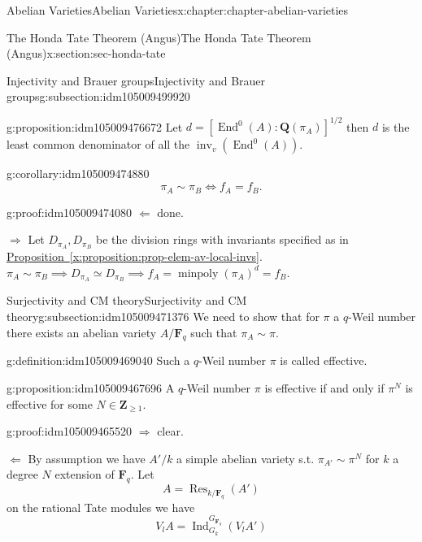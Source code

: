 \documentclass[oneside,10pt,]{book}
\numberwithin{equation}{section}
\newcommand{\lb}{[}
\newcommand{\rb}{]}
\newcommand{\ZZ}{\mathbf{Z}}
\newcommand{\QQ}{\mathbf{Q}}
\newcommand{\FF}{\mathbf{F}}
\DeclareMathOperator{\End}{End}
\DeclareMathOperator{\Ind}{Ind}
\DeclareMathOperator{\Res}{Res}
\begin{document}
\begin{chapterptx}{Abelian Varieties}{}{Abelian Varieties}{}{}{x:chapter:chapter-abelian-varieties}
\begin{sectionptx}{The Honda Tate Theorem (Angus)}{}{The Honda Tate Theorem (Angus)}{}{}{x:section:sec-honda-tate}
\begin{subsectionptx}{Injectivity and Brauer groups}{}{Injectivity and Brauer groups}{}{}{g:subsection:idm105009499920}
\begin{proposition}{}{}{g:proposition:idm105009476672}
Let \(d= \lb \End^0(A) : \QQ(\pi_A) \rb^{1/2}\) then \(d\) is the least common denominator of all the \(\operatorname{inv}_v(\End^0(A))\).%
\end{proposition}
\begin{corollary}{}{}{g:corollary:idm105009474880}%
%
\begin{equation*}
\pi_A\sim \pi_B \iff f_A = f_B\text{.}
\end{equation*}
%
\end{corollary}
\begin{proofptx}{}{g:proof:idm105009474080}
\(\Leftarrow\) done.%
\par
\(\Rightarrow\) Let \(D_{\pi_A} , D_{\pi_B}\) be the division rings with invariants specified as in \hyperref[x:proposition:prop-elem-av-local-invs]{Proposition~\ref{x:proposition:prop-elem-av-local-invs}}. \(\pi_A\sim \pi_B \implies D_{\pi_A} \simeq D_{\pi_B} \implies f_A = \operatorname{minpoly}(\pi_A) ^d = f_B\).%
\end{proofptx}
\end{subsectionptx}
%
%
\typeout{************************************************}
\typeout{************************************************}
%
\begin{subsectionptx}{Surjectivity and CM theory}{}{Surjectivity and CM theory}{}{}{g:subsection:idm105009471376}
We need to show that for \(\pi\) a \(q\)-Weil number there exists an abelian variety \(A/\FF_q\) such that \(\pi_A \sim \pi\).%
\begin{definition}{}{g:definition:idm105009469040}%
Such a \(q\)-Weil number \(\pi\) is called effective.%
\end{definition}
\begin{proposition}{}{}{g:proposition:idm105009467696}%
A \(q\)-Weil number \(\pi\) is effective if and only if \(\pi^N\) is effective for some \(N\in \ZZ_{\ge 1}\).%
\end{proposition}
\begin{proofptx}{}{g:proof:idm105009465520}
\(\Rightarrow\) clear.%
\par
\(\Leftarrow\) By assumption we have \(A'/k\) a simple abelian variety s.t. \(\pi_{A'} \sim  \pi^N\) for \(k\) a degree \(N\) extension of \(\FF_q\). Let%
\begin{equation*}
A = \Res_{k/\FF_q}(A')
\end{equation*}
on the rational Tate modules we have%
\begin{equation*}
V_l A = \Ind_{G_k}^{G_{\FF_q}} (V_lA')
\end{equation*}

\end{proofptx}
\end{subsectionptx}
\end{sectionptx}
\end{chapterptx}
\end{document}
